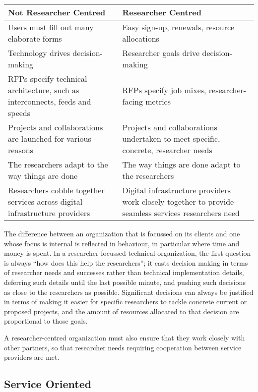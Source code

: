 \documentclass[11pt, letterpaper, twoside]{article}
\begin{document}
\begin{table}[ht]
\centering
\small {\sffamily
{}
\begin{tabular}{P{2.5in}|P{2.5in}}
\textcolor{cdaRed}{\textbf{Not Researcher Centred}} & \textcolor{cdaRed}{\textbf{Researcher Centred}} \\
\hline \hline
Users must fill out many elaborate forms & Easy sign-up, renewals, resource allocations\\
Technology drives decision-making & Researcher goals drive decision-making\\
RFPs specify technical architecture, such as interconnects, feeds and speeds & RFPs specify job mixes, researcher-facing metrics \\
Projects and collaborations are launched for various reasons & Projects and collaborations undertaken to meet specific, concrete, researcher needs\\ 
The researchers adapt to the way things are done & The way things are done adapt to the researchers\\
Researchers cobble together services across digital infrastructure providers & Digital infrastructure providers work closely together to provide seamless services researchers need \\
\hline
\end{tabular}
}
\end{table}

The difference between an organization that is focussed on its clients
and one whose focus is internal is reflected in behaviour, in particular
where time and money is spent. In a researcher-focussed technical
organization, the first question is always ``how does this help the
researchers''; it casts decision making in terms of researcher needs and
successes rather than technical implementation details, deferring such
details until the last possible minute, and pushing such decisions as
close to the researchers as possible.  Significant decisions can always
be justified in terms of making it easier for specific researchers to
tackle concrete current or proposed projects, and the amount of
resources allocated to that decision are proportional to those goals.

A researcher-centred organization must also ensure that they work
closely with other partners, so that researcher needs requiring
cooperation between service providers are met.

\subsection*{Service Oriented}
%
\end{document}
